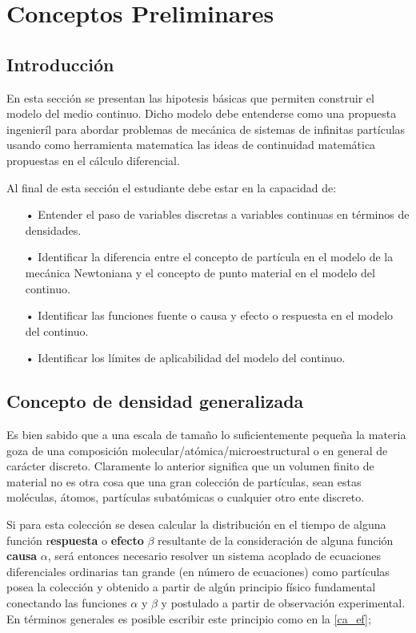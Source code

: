 \documentclass[../notas medios.tex]{subfiles}
\begin{document}
\chapter{Conceptos Preliminares}

\graphicspath{{IMAGES/Cap1/}} 								 %
\section{Introducción}
En esta sección se presentan las hipotesis básicas que permiten construir el modelo del medio continuo. Dicho modelo debe entenderse como una propuesta ingenieríl para abordar problemas de mecánica de sistemas de infinitas partículas usando como herramienta matematica las ideas de continuidad matemática propuestas en el cálculo diferencial.

Al final de esta sección el estudiante debe estar en la capacidad de:
%
\begin{itemize}
\item[•] Entender el paso de variables discretas a variables continuas en términos de densidades.
\item[•] Identificar la diferencia entre el concepto de partícula en el modelo de la mecánica Newtoniana y el concepto de punto material en el modelo del continuo.
\item[•] Identificar las funciones fuente o causa y efecto o respuesta en el modelo del continuo.
\item[•] Identificar los límites de aplicabilidad del modelo del continuo.
\end{itemize}
%
\section{Concepto de densidad generalizada}
Es bien sabido que a una escala de tamaño lo suficientemente pequeña la materia goza de una composición molecular/atómica/microestructural o en general de carácter discreto.  Claramente lo anterior significa que un volumen finito de material no es otra cosa que una gran colección de partículas, sean estas moléculas, átomos, partículas subatómicas o cualquier otro ente discreto.

Si para esta colección se desea calcular la distribución en el tiempo de alguna función r{\bf espuesta} o {\bf efecto} $\beta$ resultante de la consideración de alguna función {\bf causa} $\alpha$, será entonces necesario resolver un sistema acoplado de ecuaciones diferenciales ordinarias tan grande (en número de ecuaciones) como partículas posea la colección y obtenido a partir de algún principio físico fundamental conectando las funciones $\alpha$ y $\beta$ y postulado a partir de observación experimental.  En términos generales es posible escribir este principio como en la \cref{ca_ef};
\end{document}
